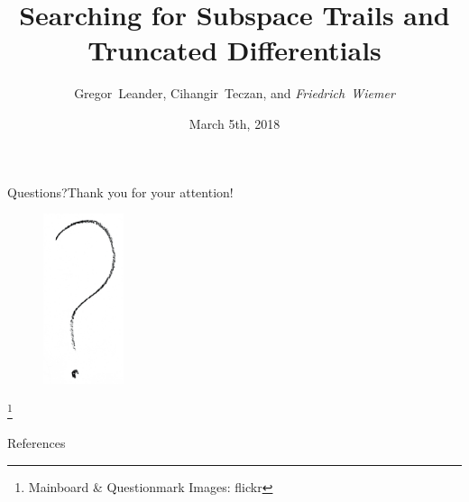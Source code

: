\documentclass[%
    10pt,
    professionalfont,
]{beamer}
\title{Searching for Subspace Trails and \\Truncated Differentials}
\subtitle{}
\author[Friedrich~Wiemer]{Gregor~Leander, Cihangir~Teczan, and \emph{Friedrich~Wiemer}}
\institute{%
    Horst Görtz Institute for IT Security\\
    Ruhr-Universität Bochum
}
\date{March 5th, 2018}
\newcommand{\blfootnote}[1]{%
    \begingroup
        \renewcommand\thefootnote{}\footnote{#1}%
        \addtocounter{footnote}{-1}%
    \endgroup
}
\begin{document}
\begin{frame}
    \titlepage{}
\end{frame}



\begin{frame}{Questions?}{Thank you for your attention!}
    \begin{figure}[!htb]
        \includegraphics[height=50mm]{data/flickr/questionmark.png}
    \end{figure}
    \blfootnote{\scriptsize Mainboard \& Questionmark Images: flickr}
\end{frame}

\begin{frame}[allowframebreaks]{References}
    \tiny
    \printbibliography{}
\end{frame}
\end{document}
